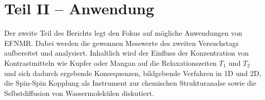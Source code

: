 \section{Teil II -- Anwendung}
\label{sec:Teil2}
Der zweite Teil des Berichts legt den Fokus auf mögliche Anwendungen von EFNMR.
Dabei werden die gewonnen Messwerte des zweiten Versuchstags aufbereitet und analysiert. Inhaltlich wird der Einfluss der Konzentration von Kontrastmitteln wie Kupfer oder Mangan auf die Relaxationszeiten $T_1$ und $T_2$ und sich dadurch ergebende Konsequenzen, bildgebende Verfahren in 1D und 2D, die Spin-Spin Kopplung als Instrument zur chemischen Strukturanalse sowie die Selbstdiffusion von Wassermolekülen diskutiert.





